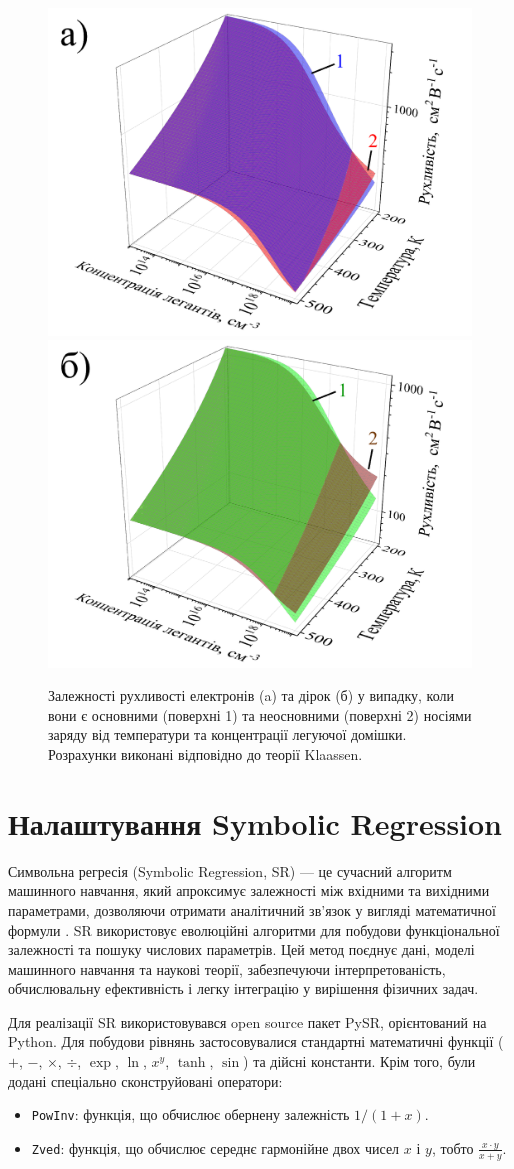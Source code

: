 \documentclass[14pt,a4paper,titlepage,oneside]{book}
\numberwithin{equation}{part}
\begin{document}
\begin{figure}
	\centering
     \includegraphics[width=0.49\linewidth]{Fig21a.png}
     \includegraphics[width=0.49\linewidth]{Fig21b.png}
	  \caption{Залежності рухливості електронів (a) та дірок (б) у випадку, коли вони є основними (поверхні 1) та неосновними (поверхні 2)
носіями заряду від температури та концентрації легуючої домішки. Розрахунки виконані відповідно до теорії Klaassen.
}\label{figMuKl}
\end{figure}

\section{Налаштування Symbolic Regression}

Символьна регресія (Symbolic Regression, SR) — це сучасний алгоритм машинного навчання, який апроксимує залежності між вхідними та вихідними параметрами, дозволяючи отримати аналітичний зв'язок у вигляді математичної формули \cite{Angelis2023}. SR використовує еволюційні алгоритми для побудови функціональної залежності та пошуку числових параметрів. Цей метод поєднує дані, моделі машинного навчання та наукові теорії, забезпечуючи інтерпретованість, обчислювальну ефективність і легку інтеграцію у вирішення фізичних задач.

Для реалізації SR використовувався open source пакет PySR, орієнтований на Python. Для побудови рівнянь застосовувалися стандартні математичні функції ($+$, $-$, $\times$, $\div$, $\exp$, $\ln$, $x^y$, $\tanh$, $\sin$) та дійсні константи. Крім того, були додані спеціально сконструйовані оператори:
\begin{itemize}
  \item \texttt{PowInv}: функція, що обчислює обернену залежність $1/(1+x)$.
  \item \texttt{Zved}: функція, що обчислює середнє гармонійне двох чисел $x$ і $y$, тобто $\frac{x \cdot y}{x + y}$.
\end{itemize}
\end{document}
